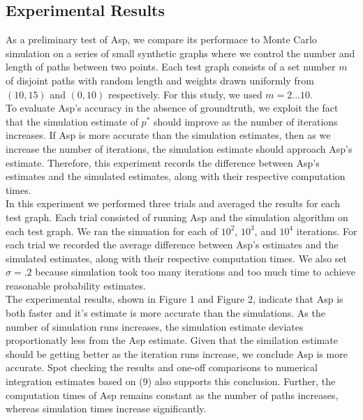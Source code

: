 \documentclass[twocolumn]{article}
\begin{document}
\subsection{Experimental Results}
As a preliminary test of Asp, we compare its performace to Monte Carlo simulation on a series of small synthetic graphs where we control the number and length of paths between two points. Each test graph consists of a set number $m$ of disjoint paths with random length and weights drawn uniformly from $(10,15)$ and $(0,10)$ respectively. For this study, we used $m = 2 \dots 10$. \\

To evaluate Asp's accuracy in the absence of groundtruth, we exploit the fact that the simulation estimate of $p^{*}$ should improve as the number of iterations increases. If Asp is more accurate than the simulation estimates, then as we increase the number of iterations, the simulation estimate should approach Asp's estimate. Therefore, this experiment records the difference between Asp's estimates and the simulated estimates, along with their respective computation times. \\

In this experiment we performed three trials and averaged the results for each test graph. Each trial consisted of running Asp and the simulation algorithm on each test graph. We ran the simuation for each of $10^{2}$, $10^{3}$, and $10^{4}$ iterations. For each trial we recorded the average difference between Asp's estimates and the simulated estimates, along with their respective computation times. We also set $\sigma = .2$ because simulation took too many iterations and too much time to achieve reasonable probability estimates.\\


The experimental results,  shown in Figure 1 and Figure 2, indicate that Asp is both faster and it's estimate is more accurate than the simulations. As the number of simulation runs increases, the simulation estimate deviates proportionatly less from the Asp estimate. Given that the similation estimate should be getting better as the iteration runs increase, we conclude Asp is more accurate. Spot checking the results and one-off comparisons to numerical integration estimates based on (9) also supports this conclusion. Further, the computation times of Asp remains constant as the number of paths increases, whereas simulation times increase significantly.
\end{document}
